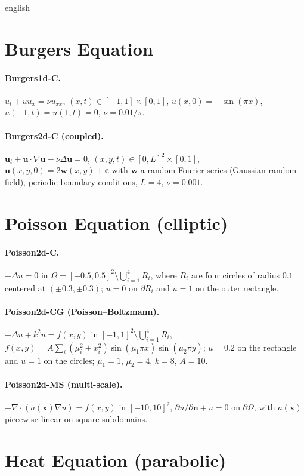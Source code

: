 \documentclass[11pt,letterpaper,twoside,openright]{book} %
\begin{document}
\begin{hyphenrules}{english}
\section{Burgers Equation}
\paragraph{Burgers1d-C.} $u_t+uu_x=\nu u_{xx}$, $(x,t)\in[-1,1]\times[0,1]$, $u(x,0)=-\sin(\pi x)$,
$u(-1,t)=u(1,t)=0$, $\nu=0.01/\pi$.

\paragraph{Burgers2d-C (coupled).} $\mathbf{u}_t+\mathbf{u}\cdot\nabla\mathbf{u}-\nu\Delta\mathbf{u}=0$,
$(x,y,t)\in[0,L]^2\times[0,1]$, $\mathbf{u}(x,y,0)=2\mathbf{w}(x,y)+\mathbf{c}$ with $\mathbf{w}$ a random
Fourier series (Gaussian random field), periodic boundary conditions, $L=4$, $\nu=0.001$.

\section{Poisson Equation (elliptic)}
\paragraph{Poisson2d-C.} $-\Delta u=0$ in $\Omega=[-0.5,0.5]^2\setminus\bigcup_{i=1}^{4}R_i$, where $R_i$
are four circles of radius $0.1$ centered at $(\pm0.3,\pm0.3)$; $u=0$ on $\partial R_i$ and $u=1$ on the
outer rectangle.

\paragraph{Poisson2d-CG (Poisson--Boltzmann).} $-\Delta u+k^2u=f(x,y)$ in
$[-1,1]^2\setminus\bigcup_{i=1}^{4}R_i$, $f(x,y)=A\sum_i(\mu_i^2+x_i^2)\sin(\mu_1\pi x)\sin(\mu_2\pi y)$;
$u=0.2$ on the rectangle and $u=1$ on the circles; $\mu_1=1$, $\mu_2=4$, $k=8$, $A=10$.

\paragraph{Poisson2d-MS (multi-scale).} $-\nabla\cdot(a(\mathbf{x})\nabla u)=f(x,y)$ in $[-10,10]^2$,
$\partial u/\partial\mathbf{n}+u=0$ on $\partial\Omega$, with $a(\mathbf{x})$ piecewise linear on square subdomains.

\section{Heat Equation (parabolic)}

\end{hyphenrules}
\end{document}
